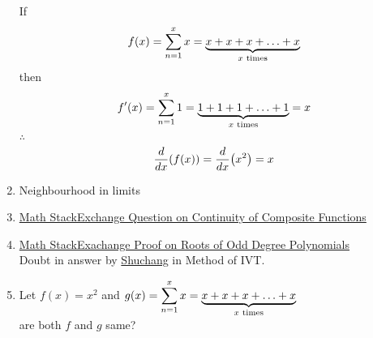 \documentclass{article}
\begin{document}
\begin{enumerate}
          If $$f(x)=\displaystyle\sum_{n=1}^{x} x=\underbrace{x+x+x+\ldots +x}_{x \hspace{1mm} \text{times}}$$
          then $$f'(x)=\displaystyle\sum_{n=1}^{x} 1=\underbrace{1+1+1+\ldots+1}_{x \hspace{1mm} \text{times}}=x$$
          $\therefore$ $$\dv{x}(f(x))=\dv{x}(x^2)=x$$
    \item Neighbourhood in limits
    \item \href{https://math.stackexchange.com/questions/4892287/is-this-result-on-continuity-of-composite-functions-true}{Math StackExchange Question on Continuity of Composite Functions}
    \item \href{https://math.stackexchange.com/questions/689575/proof-that-every-polynomial-of-odd-degree-has-one-real-root}{Math StackExachange Proof on Roots of Odd Degree Polynomials } \\ Doubt in answer by  \href{https://math.stackexchange.com/users/91982/shuchang}{Shuchang} in Method of IVT.
    \item Let $f(x)=x^2$ and $g(x)=\displaystyle\sum_{n=1}^{x}x=\underbrace{x+x+x+\ldots +x}_{x \hspace{1mm} \text{times}}$
          \\ are both $f$ and $g$ same?
\end{enumerate}
\end{document}
